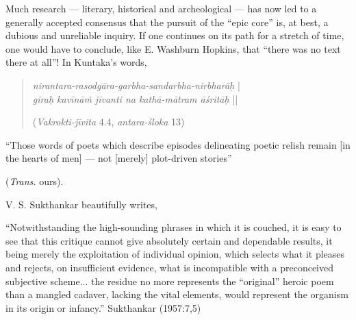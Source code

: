 Much research --- literary, historical and archeological --- has now led to a generally accepted consensus that the pursuit of the “epic core” is, at best, a dubious and unreliable inquiry. If one continues on its path for a stretch of time, one would have to conclude, like E. Washburn Hopkins, that “there was no text there at all”! In Kuntaka's words, 
\begin{quote}
{{\sl nirantara-rasodgāra-garbha-sandarbha-nirbharāḥ}} |\\
{\sl giraḥ kavīnāṁ jīvanti na kathā-mātram āśritāḥ} || 

\hfill({\sl Vakrokti-jīvita} 4.4, {\sl antara-śloka} 13)
\end{quote}

\begin{myquote}
``Those words of poets which describe episodes delineating poetic relish remain [in the hearts of men] --- not [merely] plot-driven stories'' 

\hfill ({\sl Trans.} ours).
\end{myquote}

V. S. Sukthankar beautifully writes, 

\begin{myquote}
“Notwithstanding the high-sounding phrases in which it is couched, it is easy to see that this critique cannot give absolutely certain and dependable results, it being merely the exploitation of individual opinion, which selects what it pleases and rejects, on insufficient evidence, what is incompatible with a preconceived subjective scheme... the residue no more represents the “original” heroic poem than a mangled cadaver, lacking the vital elements, would represent the organism in its origin or infancy.”
\hfill Sukthankar (1957:7,5)\\[-.6cm]
\end{myquote}

